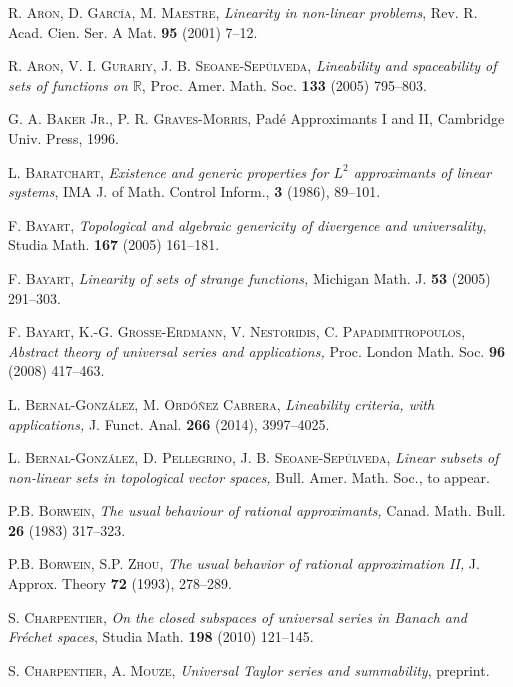 \documentclass[12pt]{amsart}
\numberwithin{equation}{section}
\begin{document}
\begin{thebibliography}{99}

 \textsc{R. Aron, D. Garc\'ia, M. Maestre}, {\it Linearity in non-linear problems}, Rev. R. Acad. Cien. Ser. A Mat. \textbf{95} (2001) 7--12.

 \textsc{R. Aron, V. I. Gurariy, J. B. Seoane-Sep\'ulveda}, {\it Lineability and spaceability of sets of functions on ${\mathbb{R}}$}, Proc. Amer. Math. Soc. \textbf{133} (2005) 795--803.

 \textsc{G. A. Baker Jr., P. R. Graves-Morris}, Pad\'e Approximants I and II, Cambridge Univ. Press, 1996.

 \textsc{L. Baratchart}, {\it Existence and generic properties for $L^{2}$ approximants of linear systems}, IMA J. of Math. Control Inform., \textbf{3} (1986),
89--101.

 \textsc{F. Bayart}, {\it Topological and algebraic genericity of divergence and universality}, Studia Math. \textbf{167} (2005) 161--181.

 \textsc{F. Bayart}, {\it Linearity of sets of strange functions,} Michigan Math. J. \textbf{53} (2005) 291--303.

 \textsc{F. Bayart, K.-G. Grosse-Erdmann, V. Nestoridis, C. Papadimitropoulos}, {\it Abstract theory of universal series and applications,} Proc. London Math. Soc. \textbf{96} (2008) 417--463.

 \textsc{L. Bernal-Gonz\'alez, M. Ord\'o\~nez Cabrera}, {\it Lineability criteria, with applications,} J. Funct. Anal. \textbf{266} (2014), 3997--4025.

 \textsc{L. Bernal-Gonz\'alez, D. Pellegrino, J. B. Seoane-Sep\'ulveda}, {\it Linear subsets of non-linear sets in topological vector spaces,} Bull. Amer. Math. Soc., to appear.

 \textsc{P.B. Borwein}, {\it The usual behaviour of rational approximants,} Canad. Math. Bull. \textbf{26} (1983) 317--323.

 \textsc{P.B. Borwein, S.P. Zhou}, {\it 
The usual behavior of rational approximation II,}
J. Approx. Theory \textbf{72} (1993), 278--289. 

\textsc{S. Charpentier}, \textit{On the closed subspaces of universal series in Banach and Fr\'echet spaces}, Studia Math. \textbf{198} (2010) 121--145.

 \textsc{S. Charpentier, A. Mouze}, {\it Universal Taylor series and summability}, preprint.


\end{thebibliography}
\end{document}
